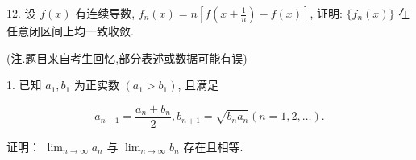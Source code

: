 \documentclass{examcollection}
\renewcommand{\displayformula}[1]{\[#1\]}
\begin{document}
{\begin{minipage}{\textwidth}
12. 设 $f(x)$ 有连续导数, $f_{n}(x) = n\left[f\left(x + \frac{1}{n}\right) - f(x)\right]$, 证明: $\{f_{n}(x)\}$ 在任意闭区间上均一致收敛.\par
{}\smallskip
(注.题目来自考生回忆,部分表述或数据可能有误)\par
1. 已知 $a_1, b_1$ 为正实数 $(a_1 > b_1)$, 且满足\par
\displayformula{a _ {n + 1} = \frac {a _ {n} + b _ {n}}{2}, b _ {n + 1} = \sqrt {b _ {n} a _ {n}} (n = 1, 2, \dots).}\par
证明： $\lim_{n\to \infty}a_n$ 与 $\lim_{n\to \infty}b_n$ 存在且相等.\par
\end{minipage}}
\ifdim\dimexpr\ht\proofbox+\dp\proofbox\relax>\textheight
\noindent\resizebox{!}{\textheight}{\usebox{\proofbox}}\else\noindent\usebox{\proofbox}\fi\clearpage
\end{document}
